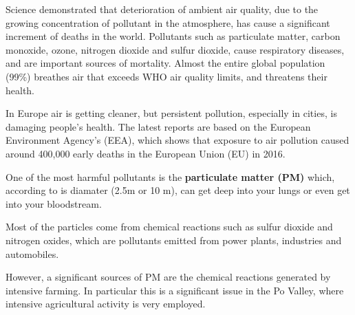Science demonstrated that deterioration of ambient air quality, due to the growing concentration of pollutant in the atmosphere, has cause a significant increment of deaths in the world.  
Pollutants such as particulate matter, carbon monoxide, ozone, nitrogen dioxide and sulfur dioxide, cause respiratory diseases, and are important sources of mortality. 
Almost the entire global population (99\%) breathes air that exceeds WHO air quality limits, and threatens their health.\par
In Europe air is getting cleaner, but persistent pollution, especially in cities, is damaging people’s health. The latest reports are based on the European Environment Agency’s (EEA), which shows that exposure to air pollution caused around 400,000 early deaths in the European Union (EU) in 2016.\par
One of the most harmful pollutants is the \textbf{particulate matter (PM)} which, according to is diamater (2.5\textmu m or 10 \textmu m), can get deep into your lungs or even get into your bloodstream.\par
Most of the particles come from chemical reactions such as sulfur dioxide and nitrogen oxides, which are pollutants emitted from power plants, industries and automobiles.\par
However, a significant sources of PM are the chemical reactions generated by intensive farming.
In particular this is a significant issue in the Po Valley, where intensive agricultural activity is very employed.


